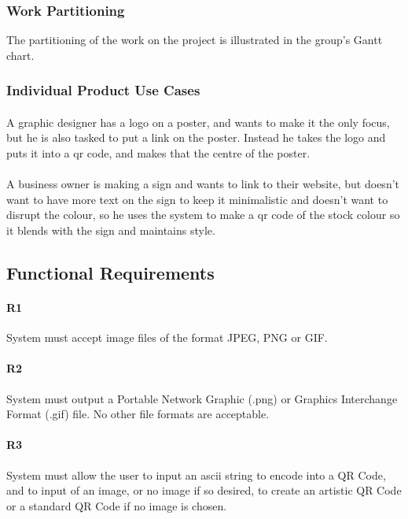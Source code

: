 \documentclass[12pt, titlepage]{article}
\begin{document}
\subsubsection{Work Partitioning}

	The partitioning of the work on the project is illustrated in the group's 
	Gantt chart.

\subsubsection{Individual Product Use Cases}

	\paragraph{}
	A graphic designer has a logo on a poster, and wants to make it the only 
	focus, but he is also tasked to put a link on the poster. Instead he takes 
	the logo and puts it into a qr code, and makes that the centre of the 
	poster.
	\paragraph{}
	 A business owner is making a sign and wants to link to their website, but 
	 doesn't want to have more text on the sign to keep it minimalistic and 
	 doesn't want to disrupt the colour, so he uses the system to make a qr 
	 code of the stock colour so it blends with the sign and maintains style.
	

\subsection{Functional Requirements}

	\paragraph{R1}
	System must accept image files of the format JPEG, PNG or GIF.
	\paragraph{R2}
	System must output a Portable Network Graphic (.png) or Graphics Interchange Format (.gif) file. No other file 
	formats are acceptable. 
	\paragraph{R3}
	System must allow the user to input an ascii string to 
	encode into a QR Code, and to input of an image, or no image if so 
	desired, to create an artistic QR Code or a standard QR Code if no image is chosen.
\end{document}
